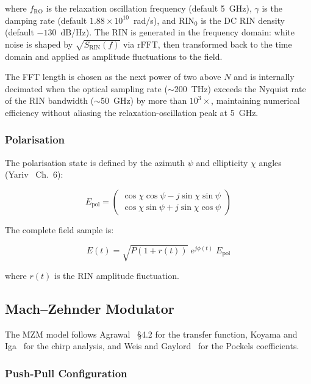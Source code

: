 \documentclass[3p,times,preprint]{elsarticle}
\begin{document}
where $f_{\text{RO}}$ is the relaxation oscillation frequency (default 5~GHz),
$\gamma$ is the damping rate (default $1.88\times10^{10}$~rad/s), and
$\text{RIN}_0$ is the DC RIN density (default $-130$~dB/Hz).
The RIN is generated in the frequency domain: white noise is shaped by
$\sqrt{S_{\text{RIN}}(f)}$ via rFFT, then transformed back to the time domain
and applied as amplitude fluctuations to the field.

The FFT length is chosen as the next power of two above $N$ and is
internally decimated when the optical sampling rate ($\sim$200~THz)
exceeds the Nyquist rate of the RIN bandwidth ($\sim$50~GHz) by more
than $10^3\times$, maintaining numerical efficiency without aliasing
the relaxation-oscillation peak at 5~GHz.

\subsubsection{Polarisation}

The polarisation state is defined by the azimuth $\psi$ and ellipticity
$\chi$ angles (Yariv~\cite{yariv} Ch.~6):

\begin{equation}
  E_{\text{pol}} = \begin{pmatrix}
    \cos\chi\cos\psi - j\sin\chi\sin\psi \\
    \cos\chi\sin\psi + j\sin\chi\cos\psi
  \end{pmatrix}
\end{equation}

The complete field sample is:

\begin{equation}
  E(t) = \sqrt{P(1 + r(t))} \; e^{j\phi(t)} \; E_{\text{pol}}
\end{equation}

where $r(t)$ is the RIN amplitude fluctuation.

\subsection{Mach--Zehnder Modulator}

The MZM model follows Agrawal~\cite{agrawal5} \S4.2 for the transfer
function, Koyama and Iga~\cite{koyama} for the chirp analysis, and
Weis and Gaylord~\cite{weis} for the Pockels coefficients.

\subsubsection{Push-Pull Configuration}
\end{document}
